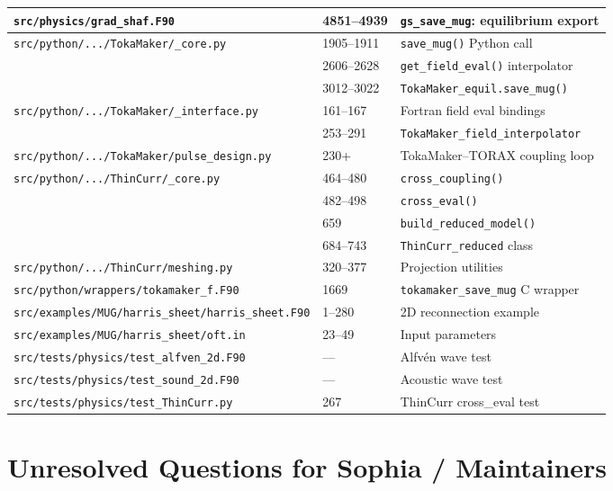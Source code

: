 \documentclass[11pt,letterpaper]{article}
\begin{document}
\begin{center}
\begin{longtable}{p{}p{}p{}}
\texttt{src/physics/grad\_shaf.F90} & 4851--4939 & \texttt{gs\_save\_mug}: equilibrium export \\
\midrule
\texttt{src/python/.../TokaMaker/\_core.py} & 1905--1911 & \texttt{save\_mug()} Python call \\
 & 2606--2628 & \texttt{get\_field\_eval()} interpolator \\
 & 3012--3022 & \texttt{TokaMaker\_equil.save\_mug()} \\
\texttt{src/python/.../TokaMaker/\_interface.py} & 161--167 & Fortran field eval bindings \\
 & 253--291 & \texttt{TokaMaker\_field\_interpolator} \\
\texttt{src/python/.../TokaMaker/pulse\_design.py} & 230+ & TokaMaker--TORAX coupling loop \\
\midrule
\texttt{src/python/.../ThinCurr/\_core.py} & 464--480 & \texttt{cross\_coupling()} \\
 & 482--498 & \texttt{cross\_eval()} \\
 & 659 & \texttt{build\_reduced\_model()} \\
 & 684--743 & \texttt{ThinCurr\_reduced} class \\
\texttt{src/python/.../ThinCurr/meshing.py} & 320--377 & Projection utilities \\
\midrule
\texttt{src/python/wrappers/tokamaker\_f.F90} & 1669 & \texttt{tokamaker\_save\_mug} C wrapper \\
\midrule
\texttt{src/examples/MUG/harris\_sheet/harris\_sheet.F90} & 1--280 & 2D reconnection example \\
\texttt{src/examples/MUG/harris\_sheet/oft.in} & 23--49 & Input parameters \\
\texttt{src/tests/physics/test\_alfven\_2d.F90} & --- & Alfv\'{e}n wave test \\
\texttt{src/tests/physics/test\_sound\_2d.F90} & --- & Acoustic wave test \\
\texttt{src/tests/physics/test\_ThinCurr.py} & 267 & ThinCurr cross\_eval test \\
\bottomrule
\end{longtable}
\end{center}

\section{Unresolved Questions for Sophia / Maintainers}
\end{document}
